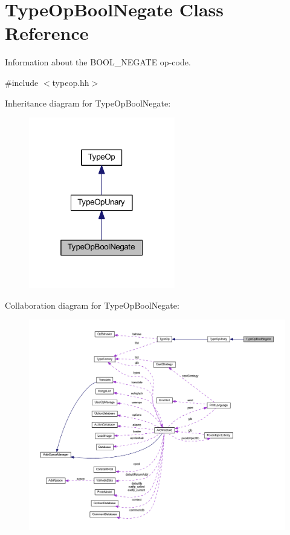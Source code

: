 \hypertarget{class_type_op_bool_negate}{}\section{Type\+Op\+Bool\+Negate Class Reference}
\label{class_type_op_bool_negate}


Information about the B\+O\+O\+L\+\_\+\+N\+E\+G\+A\+TE op-\/code.  




{\ttfamily \#include $<$typeop.\+hh$>$}



Inheritance diagram for Type\+Op\+Bool\+Negate\+:
\nopagebreak
\begin{figure}[H]
\begin{center}
\leavevmode
\includegraphics[width=181pt]{class_type_op_bool_negate__inherit__graph}
\end{center}
\end{figure}


Collaboration diagram for Type\+Op\+Bool\+Negate\+:
\nopagebreak
\begin{figure}[H]
\begin{center}
\leavevmode
\includegraphics[width=350pt]{class_type_op_bool_negate__coll__graph}
\end{center}
\end{figure}
